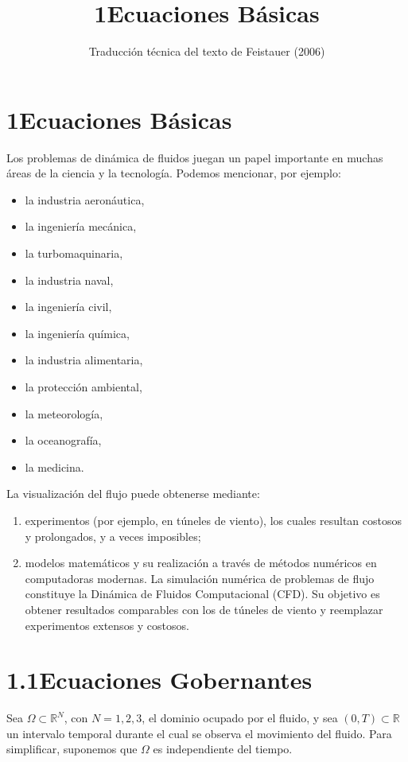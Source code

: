 \documentclass[12pt,a4paper]{article}
\title{1\quad Ecuaciones Básicas}
\author{Traducción técnica del texto de Feistauer (2006)}
\date{}
\begin{document}
\maketitle

\section*{1\quad Ecuaciones Básicas}

Los problemas de dinámica de fluidos juegan un papel importante en muchas áreas de la ciencia y la tecnología. Podemos mencionar, por ejemplo:

\begin{itemize}
  \item la industria aeronáutica,
  \item la ingeniería mecánica,
  \item la turbomaquinaria,
  \item la industria naval,
  \item la ingeniería civil,
  \item la ingeniería química,
  \item la industria alimentaria,
  \item la protección ambiental,
  \item la meteorología,
  \item la oceanografía,
  \item la medicina.
\end{itemize}

La visualización del flujo puede obtenerse mediante:
\begin{enumerate}
  \item experimentos (por ejemplo, en túneles de viento), los cuales resultan costosos y prolongados, y a veces imposibles;
  \item modelos matemáticos y su realización a través de métodos numéricos en computadoras modernas. La simulación numérica de problemas de flujo constituye la Dinámica de Fluidos Computacional (CFD). Su objetivo es obtener resultados comparables con los de túneles de viento y reemplazar experimentos extensos y costosos.
\end{enumerate}

\section*{1.1\quad Ecuaciones Gobernantes}

Sea $\Omega \subset \mathbb{R}^N$, con $N = 1,2,3$, el dominio ocupado por el fluido, y sea $(0,T) \subset \mathbb{R}$ un intervalo temporal durante el cual se observa el movimiento del fluido. Para simplificar, suponemos que $\Omega$ es independiente del tiempo.
\end{document}
